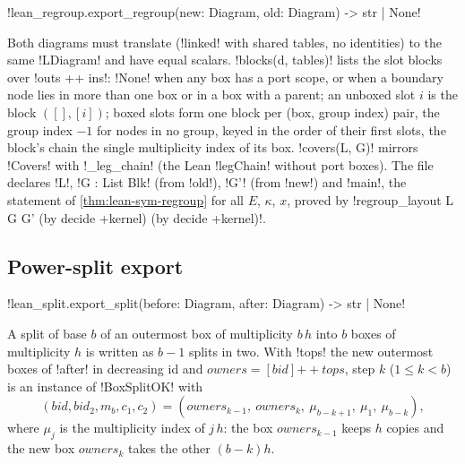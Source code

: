 \begin{signature}
\py!lean_regroup.export_regroup(new: Diagram, old: Diagram) -> str | None!
\end{signature}

Both diagrams must translate (\py!linked! with shared tables, no identities) to the same \lean!LDiagram! and have equal scalars. \py!blocks(d, tables)! lists the slot blocks over \lean!outs ++ ins!: \py!None! when any box has a port scope, or when a boundary node lies in more than one box or in a box with a parent; an unboxed slot $i$ is the block $([],[i])$; boxed slots form one block per (box, group index) pair, the group index $-1$ for nodes in no group, keyed in the order of their first slots, the block's chain the single multiplicity index of its box. \py!covers(L, G)! mirrors \lean!Covers! with \py!_leg_chain! (the Lean \lean!legChain! without port boxes). The file declares \lean!L!, \lean!G : List Blk! (from \py!old!), \lean!G'! (from \py!new!) and \lean!main!, the statement of \cref{thm:lean-sym-regroup} for all $E$, $\kappa$, $x$, proved by \lean!regroup_layout L G G' (by decide +kernel) (by decide +kernel)!.

\subsection{Power-split export}

\begin{signature}
\py!lean_split.export_split(before: Diagram, after: Diagram) -> str | None!
\end{signature}

A split of base $b$ of an outermost box of multiplicity $b\,h$ into $b$ boxes of multiplicity $h$ is written as $b-1$ splits in two. With \py!tops! the new outermost boxes of \py!after! in decreasing id and $\mathit{owners}=[\mathit{bid}]\mathbin{+\!\!+}\mathit{tops}$, step $k$ ($1\le k<b$) is an instance of \lean!BoxSplitOK! with
\[
(\mathit{bid},\mathit{bid}_2,m_b,c_1,c_2)=(\mathit{owners}_{k-1},\ \mathit{owners}_k,\ \mu_{b-k+1},\ \mu_1,\ \mu_{b-k}),
\]
where $\mu_j$ is the multiplicity index of $j\,h$: the box $\mathit{owners}_{k-1}$ keeps $h$ copies and the new box $\mathit{owners}_k$ takes the other $(b-k)h$.

